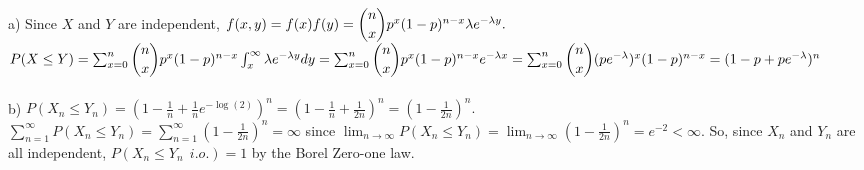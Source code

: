 a) Since $X$ and $Y$ are independent, $f(x,y)=f(x)f(y) = \dbinom{n}{x}p^{x}(1-p)^{n-x} \lambda e^{-\lambda y}.$\\
$P(X \leq Y) = \sum_{x=0}^{n} \dbinom{n}{x}p^{x}(1-p)^{n-x} \int_{x}^{\infty} \lambda e^{-\lambda y} dy = \sum_{x=0}^{n} \dbinom{n}{x}p^{x}(1-p)^{n-x} e^{-\lambda x} =  \sum_{x=0}^{n} \dbinom{n}{x}(pe^{-\lambda})^{x}(1-p)^{n-x} =(1 - p + pe^{-\lambda})^{n}$\\
\\
b) $P(X_{n} \leq Y_{n}) = (1 - \frac{1}{n} + \frac{1}{n}e^{-\log(2)})^{n} =  (1 - \frac{1}{n} + \frac{1}{2n})^{n} = (1 - \frac{1}{2n})^{n}.$\\
$\sum_{n=1}^{\infty} P(X_{n} \leq Y_{n}) = \sum_{n=1}^{\infty} (1 - \frac{1}{2n})^{n} = \infty$ since $\lim_{n \rightarrow \infty} P(X_{n} \leq Y_{n}) = \lim_{n \rightarrow \infty} (1 - \frac{1}{2n})^{n} = e^{-2} < \infty.$ So, since $X_{n}$ and $Y_{n}$ are all independent, $P(X_{n} \leq Y_{n} \ \ i.o.) = 1$ by the Borel Zero-one law. 
